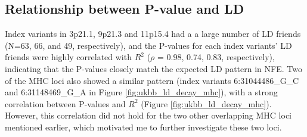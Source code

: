     \subsection{Relationship between P-value and LD} \label{sec:ukbb_postgwas}
  Index variants in 3p21.1, 9p21.3 and 11p15.4 had a a large number of LD friends (N=63, 66, and 49, respectively), and the P-values for each index variants' LD friends were highly correlated with $R^{2}$ ($\rho$ = 0.98, 0.74, 0.83, respectively), indicating that the P-values closely match the expected LD pattern in
  NFE. Two of the MHC loci also showed a similar pattern (index variants 6:31044486\_G\_C and 6:31148469\_G\_A in Figure \ref{fig:ukbb_ld_decay_mhc}), with a strong correlation between P-values and $R^{2}$ (Figure \ref{fig:ukbb_ld_decay_mhc}). However, this correlation did not hold for the two other overlapping MHC loci mentioned earlier, which motivated me to further investigate these two loci.
  
